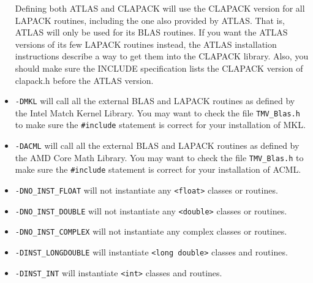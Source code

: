\documentclass[twoside,letterpaper,11pt]{article}
\renewcommand{\tt}[1]{{\texttt {#1}}}
\begin{document}
\begin{itemize}
Defining both ATLAS and CLAPACK will use
the CLAPACK version for all LAPACK routines, including the one also provided by 
ATLAS.  That is, ATLAS will only be used for its BLAS routines.  If you want
the ATLAS versions of its few LAPACK routines instead, the ATLAS 
installation instructions describe a way to get them into the CLAPACK library.
Also, you should make sure the INCLUDE specification lists the CLAPACK
version of clapack.h before the ATLAS version.
\item
\tt{-DMKL} will call all the external BLAS and LAPACK routines as defined by the
Intel Match Kernel Library.  You may want to check the file \tt{TMV\_Blas.h} to 
make sure the \tt{\#include} statement is correct for your installation of MKL.
\item
\tt{-DACML} will call all the external BLAS and LAPACK routines as defined by the 
AMD Core Math Library.  You may want to check the file \tt{TMV\_Blas.h} to make
sure the \tt{\#include} statement is correct for your installation of ACML.
\item
\tt{-DNO\_INST\_FLOAT} will not instantiate any \tt{<float>} classes or routines.
\item
\tt{-DNO\_INST\_DOUBLE} will not instantiate any \tt{<double>} classes or routines.
\item
\tt{-DNO\_INST\_COMPLEX} will not instantiate any complex classes or routines.
\item
\tt{-DINST\_LONGDOUBLE} will instantiate \tt{<long double>} classes and routines.
\item
\tt{-DINST\_INT} will instantiate \tt{<int>} classes and routines.
\end{itemize}
\end{document}

